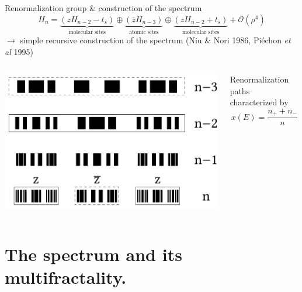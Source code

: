 \documentclass[xcolor=x11names,compress,professionalfonts]{beamer}
\renewcommand{\(}{\begin{columns}}
\renewcommand{\)}{\end{columns}}
\newcommand{\<}[1]{\begin{column}{#1}}
\renewcommand{\>}{\end{column}}
\newcommand{\zb}{\ensuremath{\overline{z}}}
\begin{document}
\begin{frame}{Renormalization group \& construction of the spectrum}
 \[ H_n = \underbrace{\left( z H_{n-2} - t_s \right)}_{\text{molecular sites}} \oplus \underbrace{\left( \zb H_{n-3} \right)}_{\text{atomic sites}} \oplus \underbrace{\left( z H_{n-2} + t_s \right)}_{\text{molecular sites}} + \mathcal{O}(\rho^4)\]
	$\rightarrow$ simple recursive construction of the spectrum (Niu \& Nori 1986, Piéchon \emph{et al} 1995)
	
	\begin{columns}
	\begin{column}{6cm}
	\centering
	\includegraphics[scale=.45]{recursive_construction_spectrum.pdf}
	\end{column}
	\begin{column}{6cm}
	
	Renormalization paths characterized by
	\[ x(E) = \frac{n_+ + n_-}{n} \]
	\end{column}
	\end{columns}
\end{frame}

\section{The spectrum and its multifractality.}
\end{document}
